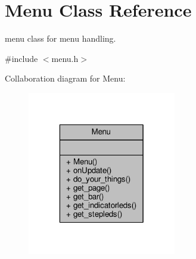 \hypertarget{classMenu}{\section{Menu Class Reference}
\label{classMenu}
}


menu class for menu handling.  




{\ttfamily \#include $<$menu.\-h$>$}



Collaboration diagram for Menu\-:\nopagebreak
\begin{figure}[H]
\begin{center}
\leavevmode
\includegraphics[width=184pt]{classMenu__coll__graph}
\end{center}
\end{figure}
